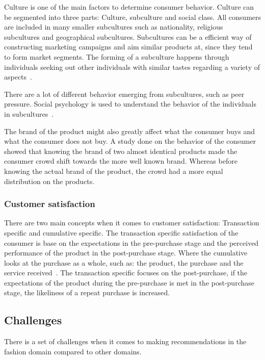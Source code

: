   Culture is one of the main factors to determine consumer behavior.  Culture can
  be segmented into three parts: Culture, subculture and social class.  All
  consumers are included in many smaller subcultures such as nationality,
  religious subcultures and geographical subcultures.  Subcultures can be a
  efficient way of constructing marketing campaigns and aim similar products at,
  since they tend to form market segments.  The forming of a subculture happens
  through individuals seeking out other individuals with similar tastes regarding
  a variety of aspects~\cite{vignali2009fashion}.

  There are a lot of different behavior emerging from subcultures, such as peer
  pressure.  Social psychology is used to understand the behavior of the
  individuals in subcultures~\cite{vignali2009fashion}.

  The brand of the product might also greatly affect what the consumer buys and
  what the consumer does not buy.  A study done on the behavior of the
  consumer~\cite{deLace2010} showed that knowing the brand of two almost
  identical products made the consumer crowd shift towards the more well known
  brand.  Whereas before knowing the actual brand of the product, the crowd had a
  more equal distribution on the products.

\subsubsection{Customer satisfaction}
  There are two main concepts when it comes to customer satisfaction: Transaction
  specific and cumulative specific.  The transaction specific satisfaction of the
  consumer is base on the expectations in the pre-purchase stage and the
  perceived performance of the product in the post-purchase stage.  Where the
  cumulative looks at the purchase as a whole, such as: the product, the purchase
  and the service received~\cite{kumari2012}.  The transaction specific focuses
  on the post-purchase, if the expectations of the product during the
  pre-purchase is met in the post-purchase stage, the likeliness of a repeat
  purchase is increased.

\subsection{Challenges}
  There is a set of challenges when it comes to making recommendations in the
  fashion domain compared to other domains.

